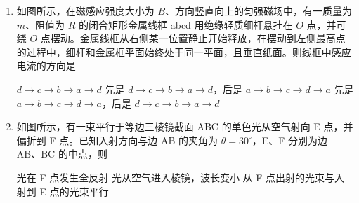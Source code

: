 \documentclass[\gkver]{gaokaozhenti}
\begin{document}
\begin{enumerate}

{$l-\frac{kq^{2}}{k_{0}l^{2}}$}
{$l-\frac{5kq^{2}}{4k_{0}l^{2}}$}
{$l-\frac{5kq^{2}}{2k_{0}l^{2}}$}


\item
如图所示，在磁感应强度大小为 $B$、方向竖直向上的匀强磁场中，有一质量为 $m$、阻值为 $R$ 的闭合矩形金属线框 abcd 用绝缘轻质细杆悬挂在 $O$ 点，并可绕 $O$ 点摆动。金属线框从右侧某一位置静止开始释放，在摆动到左侧最高点的过程中，细杆和金属框平面始终处于同一平面，且垂直纸面。则线框中感应电流的方向是


{$d\to c\to b\to a\to d$}
{先是 $d\to c\to b\to a\to d$，后是 $a\to b\to c\to d\to a$}
{先是 $a\to b\to c\to d\to a$，后是 $d\to c\to b\to a\to d$}


\item
如图所示，有一束平行于等边三棱镜截面 ABC 的单色光从空气射向 E 点，并偏折到 F 点。已知入射方向与边 AB 的夹角为 $\theta=30^\circ$，E、F 分别为边 AB、BC 的中点，则


{光在 F 点发生全反射}
{光从空气进入棱镜，波长变小}
{从 F 点出射的光束与入射到 E 点的光束平行}



\end{enumerate}
\end{document}
